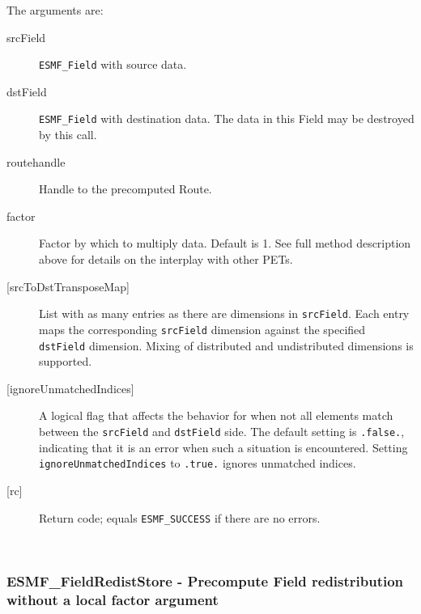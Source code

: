    The arguments are: 
   \begin{description} 
   \item [srcField]  
     {\tt ESMF\_Field} with source data. 
   \item [dstField] 
     {\tt ESMF\_Field} with destination data. The data in this Field may be
       destroyed by this call.
   \item [routehandle] 
     Handle to the precomputed Route. 
   \item [factor]
     Factor by which to multiply data. Default is 1. See full method
     description above for details on the interplay with other PETs.
   \item [{[srcToDstTransposeMap]}] 
     List with as many entries as there are dimensions in {\tt srcField}. Each
     entry maps the corresponding {\tt srcField} dimension against the specified
     {\tt dstField} dimension. Mixing of distributed and undistributed
     dimensions is supported.
   \item [{[ignoreUnmatchedIndices]}]
     A logical flag that affects the behavior for when not all elements match
     between the {\tt srcField} and {\tt dstField} side. The default setting
     is {\tt .false.}, indicating that it is an error when such a situation is 
     encountered. Setting {\tt ignoreUnmatchedIndices} to {\tt .true.} ignores
     unmatched indices.
   \item [{[rc]}]  
     Return code; equals {\tt ESMF\_SUCCESS} if there are no errors. 
   \end{description} 
    
 
\mbox{}\hrulefill\ 
 
\subsubsection [ESMF\_FieldRedistStore] {ESMF\_FieldRedistStore - Precompute Field redistribution without a local factor argument }


